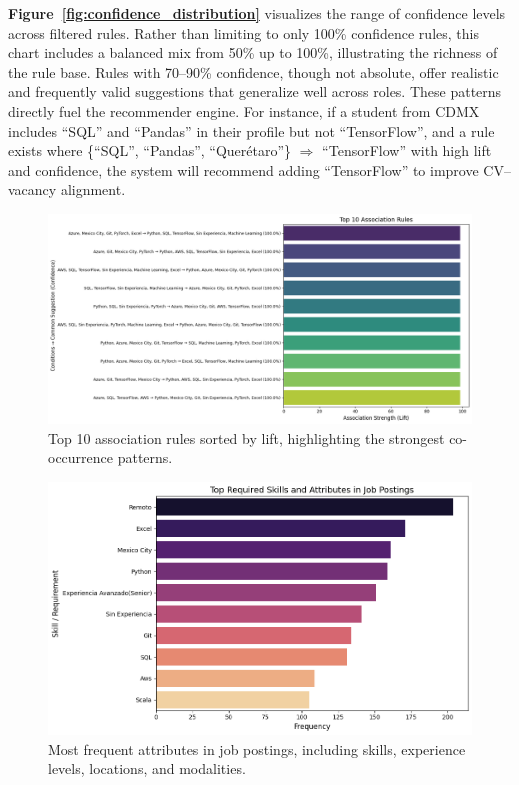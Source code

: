 \documentclass{svproc} %
\begin{document}
	\textbf{Figure~\ref{fig:confidence_distribution}} visualizes the range of confidence levels across filtered rules. Rather than limiting to only 100\% confidence rules, this chart includes a balanced mix from 50\% up to 100\%, illustrating the richness of the rule base. Rules with 70–90\% confidence, though not absolute, offer realistic and frequently valid suggestions that generalize well across roles.
	These patterns directly fuel the recommender engine. For instance, if a student from CDMX includes “SQL” and “Pandas” in their profile but not “TensorFlow”, and a rule exists where \{“SQL”, “Pandas”, “Querétaro”\} $\Rightarrow$ “TensorFlow” with high lift and confidence, the system will recommend adding “TensorFlow” to improve CV–vacancy alignment.
	\begin{figure}
		\centering
		\includegraphics[width=1\linewidth]{imagenes/top_rules.png}
		\caption{Top 10 association rules sorted by lift, highlighting the strongest co-occurrence patterns.}
		\label{fig:top_rules}
	\end{figure}
	
	\begin{figure}
		\centering
		\includegraphics[width=1\linewidth]{imagenes/frequent_attributes.png}
		\caption{Most frequent attributes in job postings, including skills, experience levels, locations, and modalities.}
		\label{fig:frequent_attrs}
	\end{figure}
	
\end{document}
